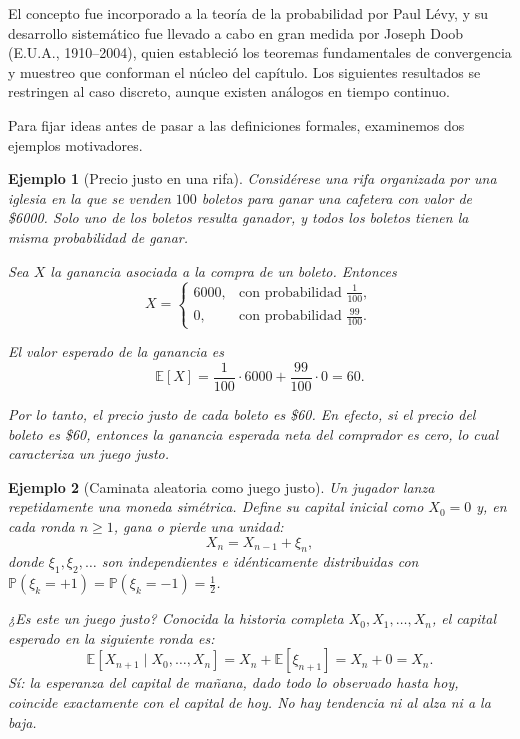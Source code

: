 \documentclass[12pt]{book}
\newtheorem{example}{Ejemplo}[chapter]
\begin{document}
El concepto fue incorporado a la teoría de la probabilidad por Paul Lévy, y su desarrollo sistemático fue llevado a cabo en gran medida por Joseph Doob (E.U.A., 1910--2004), quien estableció los teoremas fundamentales de convergencia y muestreo que conforman el núcleo del capítulo. Los siguientes resultados se restringen al caso discreto, aunque existen análogos en tiempo continuo.
\medskip

Para fijar ideas antes de pasar a las definiciones formales, examinemos dos ejemplos motivadores.

\begin{example}[Precio justo en una rifa]
Considérese una rifa organizada por una iglesia en la que se venden $100$ boletos para ganar una cafetera con valor de \$6000. Solo uno de los boletos resulta ganador, y todos los boletos tienen la misma probabilidad de ganar.

Sea $X$ la ganancia asociada a la compra de un boleto. Entonces
\[
X =
\begin{cases}
6000, & \text{con probabilidad } \frac{1}{100},\\
0, & \text{con probabilidad } \frac{99}{100}.
\end{cases}
\]

El valor esperado de la ganancia es
\[
\mathbb{E}[X] = \frac{1}{100}\cdot 6000 + \frac{99}{100}\cdot 0 = 60.
\]

Por lo tanto, el \emph{precio justo} de cada boleto es \$60. En efecto, si el precio del boleto es \$60, entonces la ganancia esperada neta del comprador es cero, lo cual caracteriza un juego justo.
\end{example}

\begin{example}[Caminata aleatoria como juego justo]
    Un jugador lanza repetidamente una moneda simétrica. Define su capital inicial como $X_0 = 0$ y, en cada ronda $n \ge 1$, gana o pierde una unidad:
    \[
        X_n = X_{n-1} + \xi_n,
    \]
    donde $\xi_1, \xi_2, \ldots$ son independientes e idénticamente distribuidas con $\mathbb{P}(\xi_k = +1) = \mathbb{P}(\xi_k = -1) = \tfrac{1}{2}$.

    ¿Es este un juego justo? Conocida la historia completa $X_0, X_1, \ldots, X_n$, el capital esperado en la siguiente ronda es:
    \[
        \mathbb{E}[X_{n+1} \mid X_0, \ldots, X_n]
        = X_n + \mathbb{E}[\xi_{n+1}]
        = X_n + 0 = X_n.
    \]
    Sí: la esperanza del capital de mañana, dado todo lo observado hasta hoy, coincide exactamente con el capital de hoy. No hay tendencia ni al alza ni a la baja.
\end{example}
\end{document}

